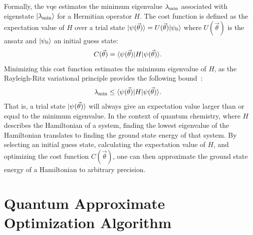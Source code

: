 Formally, the \gls{vqe} estimates the minimum eigenvalue $\lambda_{\textnormal{min}}$ associated with eigenstate $\vert{\lambda_{\textnormal{min}}}\rangle$ for a Hermitian operator $H$.
The cost function is defined as the expectation value of $H$ over a trial state $\vert{\psi({\vec{\theta}})}\rangle = U(\vec{\theta})\vert{\psi_0}\rangle$ where $U(\vec{\theta})$ is the ansatz and $\vert{\psi_0}\rangle$ an initial guess state:
\begin{equation}
C(\vec{\theta}) = \langle{\psi(\vec{\theta})}\vert H\vert{\psi(\vec{\theta})}\rangle.
\end{equation}
Minimizing this cost function estimates the minimum eigenvalue of $H$, as the Rayleigh-Ritz variational principle provides the following bound~\cite{ritz1909neue}:
\begin{equation}
\lambda_{\textnormal{min}} \leq \langle{\psi(\vec{\theta})}\vert H\vert{\psi(\vec{\theta})}\rangle.
\end{equation}
That is, a trial state $\vert{\psi({\vec{\theta}})}\rangle$ will always give an expectation value larger than or equal to the minimum eigenvalue.
In the context of quantum chemistry, where $H$ describes the Hamiltonian of a system, finding the lowest eigenvalue of the Hamiltonian translates to finding the ground state energy of that system.
By selecting an initial guess state, calculating the expectation value of $H$, and optimizing the cost function $C(\vec{\theta})$, one can then approximate the ground state energy of a Hamiltonian to arbitrary precision.


\section{Quantum Approximate Optimization Algorithm}